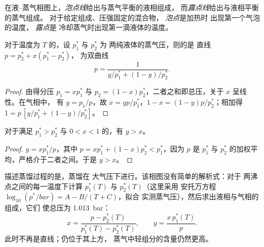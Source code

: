 \begin{definition}[泡点线与露点线]\label{def:b2:liquid-vapour-diagrams:bubble-dew}
在液–蒸气相图上，\emph{泡点线}给出与蒸气平衡的液相组成，
而\emph{露点线}给出与液相平衡的蒸气组成。
对于给定组成、压强固定的混合物，
\emph{泡点}是加热时
出现第一个气泡的温度，
\emph{露点}是
冷却蒸气时出现第一滴液体的温度。
\end{definition}

\begin{proposition}[理想曲线]\label{prop:b2:liquid-vapour-diagrams:ideal-curves}
对于温度为 $T$ 的，设 $p_1^*$ 与 $p_2^*$ 为
两纯液体的蒸气压，则的是
直线 $p = p_2^* + x(p_1^* - p_2^*)$，
为双曲线
\[
  p = \frac{1}{y/p_1^* + (1 - y)/p_2^*} .
\]
\end{proposition}

\begin{proof}
由得分压 $p_1 = xp_1^*$ 与 $p_2 = (1 -
x)p_2^*$，二者之和即总压，关于 $x$ 呈线性。在气相中，
有 $y = p_1/p$，故 $x = yp/p_1^*$，$1 - x = (1 - y)p/p_2^*$；相加得
$1 = p\,[y/p_1^* + (1 - y)/p_2^*]$。
\end{proof}

\begin{proposition}[蒸气中易挥发组分的含量更高]\label{prop:b2:liquid-vapour-diagrams:richer}
对于满足 $p_1^* > p_2^*$ 与 $0 < x < 1$ 的，有 $y > x$。
\end{proposition}

\begin{proof}
$y = xp_1^*/p$，其中 $p = xp_1^* + (1 - x)p_2^* < p_1^*$，因为 $p$ 是
$p_1^*$ 与 $p_2^*$ 的加权平均，严格介于二者之间。于是 $y >
x$。
\end{proof}

描述蒸馏过程的是，蒸馏在
大气压下进行。该相图没有简单的解析式：对于
两沸点之间的每一温度下计算 $p_1^*(T)$ 与 $p_2^*(T)$（这里采用
安托万方程 $\log_{10}(p^*/\unit{bar}) = A - B/(T + C)$，拟合
实测蒸气压），然后求出液相与气相的组成，它们
使总压为 \qty{1.013}{bar}：
\[
  x = \frac{p - p_2^*(T)}{p_1^*(T) - p_2^*(T)}, \qquad y = \frac{x\,p_1^*(T)}{p} .
\]
此时不再是直线；仍位于其上方，
蒸气中轻组分的含量仍然更高。

